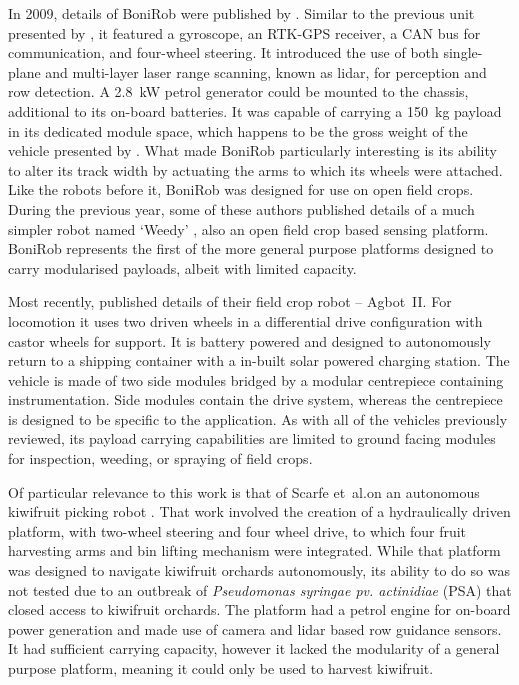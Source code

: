 \documentclass[preprint,authoryear,12pt]{elsarticle}
\begin{document}
        In 2009, details of BoniRob were published by \cite{Ruckelshausen2009}.
        Similar to the previous unit presented by \cite{Bak2004}, it featured a gyroscope, an RTK-GPS receiver, a CAN bus for communication, and four-wheel steering.
        It introduced the use of both single-plane and multi-layer laser range scanning, known as lidar, for perception and row detection.
        A \SI{2.8}{\kilo\watt} petrol generator could be mounted to the chassis, additional to its on-board batteries.
        It was capable of carrying a \SI{150}{\kilo\gram} payload in its dedicated module space, which happens to be the gross weight of the vehicle presented by \cite{Bak2004}.
        What made BoniRob particularly interesting is its ability to alter its track width by actuating the arms to which its wheels were attached.
        Like the robots before it, BoniRob was designed for use on open field crops.
        During the previous year, some of these authors published details of a much simpler robot named `Weedy' \citep{Klose2008}, also an open field crop based sensing platform.
        BoniRob represents the first of the more general purpose platforms designed to carry modularised payloads, albeit with limited capacity.


        Most recently, \cite{Bawden2017} published details of their field crop robot -- Agbot~II.
        For locomotion it uses two driven wheels in a differential drive configuration with castor wheels for support.
        It is battery powered and designed to autonomously return to a shipping container with a in-built solar powered charging station.
        The vehicle is made of two side modules bridged by a modular centrepiece containing instrumentation.
        Side modules contain the drive system, whereas the centrepiece is designed to be specific to the application.
        As with all of the vehicles previously reviewed, its payload carrying capabilities are limited to ground facing modules for inspection, weeding, or spraying of field crops.


        Of particular relevance to this work is that of Scarfe et~al.\@ on an autonomous kiwifruit picking robot \citep{scarfe2009, Scarfe2012}.
        That work involved the creation of a hydraulically driven platform, with two-wheel steering and four wheel drive, to which four fruit harvesting arms and bin lifting mechanism were integrated.
        While that platform was designed to navigate kiwifruit orchards autonomously, its ability to do so was not tested due to an outbreak of \textit{Pseudomonas syringae pv. actinidiae} (PSA) that closed access to kiwifruit orchards.
        The platform had a petrol engine for on-board power generation and made use of camera and lidar based row guidance sensors.
        It had sufficient carrying capacity, however it lacked the modularity of a general purpose platform, meaning it could only be used to harvest kiwifruit.
\end{document}
